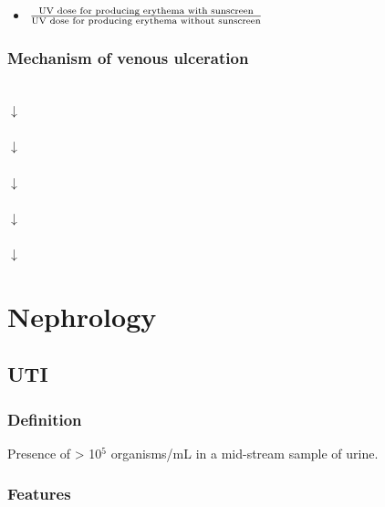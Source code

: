 \documentclass[
  12pt,
]{memoir}
\providecommand{\tightlist}{%
  \setlength{\itemsep}{0pt}\setlength{\parskip}{0pt}}
\begin{document}
\begin{itemize}
\tightlist
\item
  \(\frac{\LARGE{\text{UV dose for producing erythema with sunscreen}}} {\LARGE{\text{UV dose for producing erythema without sunscreen}}}\)
\end{itemize}

\hypertarget{mechanism-of-venous-ulceration}{%
\subsection{Mechanism of venous
ulceration}\label{mechanism-of-venous-ulceration}}

\begin{center}
 \\
$\downarrow$ \\
 \\
$\downarrow$ \\
 \\
$\downarrow$ \\
 \\
$\downarrow$ \\
 \\
$\downarrow$ \\
\end{center}

\pagebreak

\hypertarget{nephrology}{%
\chapter{Nephrology}\label{nephrology}}

\hypertarget{uti}{%
\section{UTI}\label{uti}}

\hypertarget{definition}{%
\subsection{Definition}\label{definition}}

Presence of \textgreater{} 10\(^5\) organisms/mL in a mid-stream sample
of urine.

\hypertarget{features-2}{%
\subsection{Features}\label{features-2}}
\end{document}
